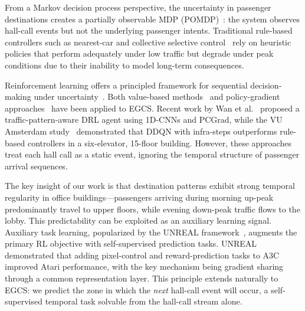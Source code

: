 \documentclass{IEEEcsmag}
\begin{document}
From a Markov decision process perspective, the uncertainty in
passenger destinations creates a partially observable MDP
(POMDP)~\cite{sutton2018reinforcement}: the system observes hall-call
events but not the underlying passenger intents. Traditional
rule-based controllers such as nearest-car and collective selective
control~\cite{siikonen1997elevator} rely on heuristic policies that
perform adequately under low traffic but degrade under peak
conditions due to their inability to model long-term consequences.

Reinforcement learning offers a principled framework for sequential
decision-making under uncertainty~\cite{sutton2018reinforcement}.
Both value-based methods~\cite{mnih2015dqn,crites1998elevator} and
policy-gradient approaches~\cite{schulman2017ppo} have been applied
to EGCS. Recent work by Wan et al.~\cite{wan2024traffic} proposed a
traffic-pattern-aware DRL agent using 1D-CNNs and PCGrad, while the
VU Amsterdam study~\cite{vu2025rl} demonstrated that DDQN with
infra-steps outperforms rule-based controllers in a six-elevator,
15-floor building. However, these approaches treat each hall call as
a static event, ignoring the temporal structure of passenger arrival
sequences.

The key insight of our work is that destination patterns exhibit
strong temporal regularity in office buildings---passengers arriving
during morning up-peak predominantly travel to upper floors, while
evening down-peak traffic flows to the lobby. This predictability can
be exploited as an auxiliary learning signal. Auxiliary task
learning, popularized by the UNREAL
framework~\cite{jaderberg2017unreal}, augments the primary RL
objective with self-supervised prediction tasks. UNREAL demonstrated
that adding pixel-control and reward-prediction tasks to A3C improved
Atari performance, with the key mechanism being gradient sharing
through a common representation layer. This principle extends
naturally to EGCS: we predict the zone in which the \emph{next}
hall-call event will occur, a self-supervised temporal task
solvable from the hall-call stream alone.
\end{document}
